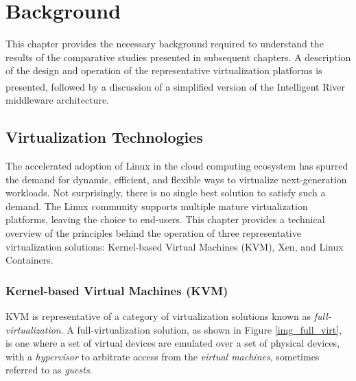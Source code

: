 \chapter{Background}

This chapter provides the necessary background required to understand the results of the comparative studies presented in subsequent chapters. A description of the design and operation of the representative virtualization platforms is presented, followed by a discussion of a simplified version of the Intelligent River\textsuperscript{\textregistered} middleware architecture.

\section{Virtualization Technologies}
The accelerated adoption of Linux in the cloud computing ecosystem has spurred the demand for dynamic, efficient, and flexible ways to virtualize next-generation workloads. Not surprisingly, there is no single best solution to satisfy such a demand. The Linux community supports multiple mature virtualization platforms, leaving the choice to end-users. This chapter provides a technical overview of the principles behind the operation of three representative virtualization solutions: Kernel-based Virtual Machines (KVM), Xen, and Linux Containers.


\subsection{Kernel-based Virtual Machines (KVM)}

KVM is representative of a category of virtualization solutions known as \emph{full-virtualization}. A full-virtualization solution, as shown in Figure \ref{img_full_virt}, is one where a set of virtual devices are emulated over a set of physical devices, with a \emph{hypervisor} to arbitrate access from the \emph{virtual machines}, sometimes referred to as \emph{guests}.



